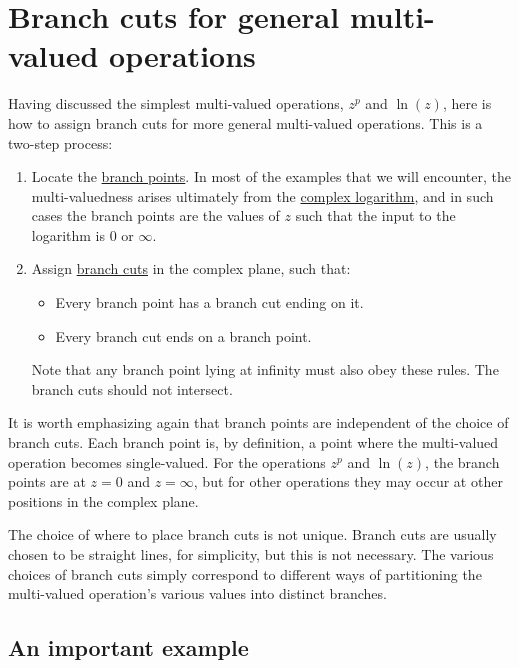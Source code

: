 \documentclass[10pt,a4paper]{article}
\begin{document}
\section{Branch cuts for general multi-valued operations}
\label{branch-cuts-for-general-multi-valued-operations}

Having discussed the simplest multi-valued operations, $z^p$ and
$\ln(z)$, here is how to assign branch cuts for more general
multi-valued operations. This is a two-step process:

\begin{enumerate}
\item
Locate the \hyperref[branch-points]{branch points}. In most of the
examples that we will encounter, the multi-valuedness arises
ultimately from the \hyperref[complex-logarithms]{complex logarithm},
and in such cases the branch points are the values of $z$ such that
the input to the logarithm is $0$ or $\infty$.

\item
Assign \hyperref[branches]{branch cuts} in the complex plane, such
that:
\begin{itemize}
\item Every branch point has a branch cut ending on it.
\item Every branch cut ends on a branch point.
\end{itemize}
Note that any branch point lying at infinity must also obey these rules.
The branch cuts should not intersect.
\end{enumerate}

\noindent
It is worth emphasizing again that branch points are independent of
the choice of branch cuts. Each branch point is, by definition, a
point where the multi-valued operation becomes single-valued. For the
operations $z^p$ and $\ln(z)$, the branch points are at $z=0$ and $z =
\infty$, but for other operations they may occur at other positions in
the complex plane.

The choice of where to place branch cuts is not unique. Branch cuts are
usually chosen to be straight lines, for simplicity, but this is not
necessary. The various choices of branch cuts simply correspond to
different ways of partitioning the multi-valued operation's various
values into distinct branches.

\subsection{An important example}
\label{an-important-example}
\end{document}
